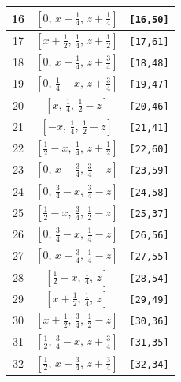 \documentclass[fleqn,8pt]{jsarticle}
\begin{document}
\begin{longtable}{ccc}
16 & $\left[ 0,\, x + \frac{1}{4},\, z + \frac{1}{4} \right]$ & {\tt [16,50]} \\ \hline
17 & $\left[ x + \frac{1}{2},\, \frac{1}{4},\, z + \frac{1}{2} \right]$ & {\tt [17,61]} \\ \hline
18 & $\left[ 0,\, x + \frac{1}{4},\, z + \frac{3}{4} \right]$ & {\tt [18,48]} \\ \hline
19 & $\left[ 0,\, \frac{1}{4} - x,\, z + \frac{3}{4} \right]$ & {\tt [19,47]} \\ \hline
20 & $\left[ x,\, \frac{1}{4},\, \frac{1}{2} - z \right]$ & {\tt [20,46]} \\ \hline
21 & $\left[ - x,\, \frac{1}{4},\, \frac{1}{2} - z \right]$ & {\tt [21,41]} \\ \hline
22 & $\left[ \frac{1}{2} - x,\, \frac{1}{4},\, z + \frac{1}{2} \right]$ & {\tt [22,60]} \\ \hline
23 & $\left[ 0,\, x + \frac{3}{4},\, \frac{3}{4} - z \right]$ & {\tt [23,59]} \\ \hline
24 & $\left[ 0,\, \frac{3}{4} - x,\, \frac{3}{4} - z \right]$ & {\tt [24,58]} \\ \hline
25 & $\left[ \frac{1}{2} - x,\, \frac{3}{4},\, \frac{1}{2} - z \right]$ & {\tt [25,37]} \\ \hline
26 & $\left[ 0,\, \frac{3}{4} - x,\, \frac{1}{4} - z \right]$ & {\tt [26,56]} \\ \hline
27 & $\left[ 0,\, x + \frac{3}{4},\, \frac{1}{4} - z \right]$ & {\tt [27,55]} \\ \hline
28 & $\left[ \frac{1}{2} - x,\, \frac{1}{4},\, z \right]$ & {\tt [28,54]} \\ \hline
29 & $\left[ x + \frac{1}{2},\, \frac{1}{4},\, z \right]$ & {\tt [29,49]} \\ \hline
30 & $\left[ x + \frac{1}{2},\, \frac{3}{4},\, \frac{1}{2} - z \right]$ & {\tt [30,36]} \\ \hline
31 & $\left[ \frac{1}{2},\, \frac{3}{4} - x,\, z + \frac{3}{4} \right]$ & {\tt [31,35]} \\ \hline
32 & $\left[ \frac{1}{2},\, x + \frac{3}{4},\, z + \frac{3}{4} \right]$ & {\tt [32,34]} \\
\end{longtable}
\renewcommand{\arraystretch}{1.2}
\end{document}
